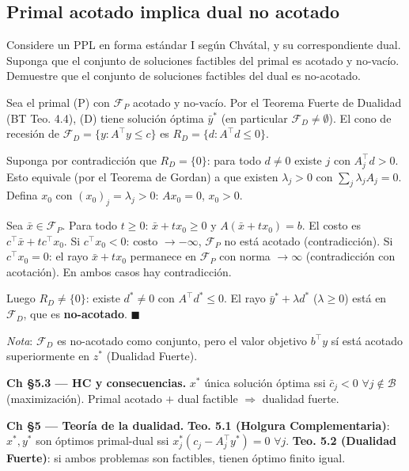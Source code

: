 \documentclass[12pt]{article}
\theoremstyle{plain}
\begin{document}
\bigskip

\subsection{Primal acotado implica dual no acotado}

Considere un PPL en forma estándar I según Chvátal, y su correspondiente dual. Suponga que
el conjunto de soluciones factibles del primal es acotado y no-vacío. Demuestre que el
conjunto de soluciones factibles del dual es no-acotado.

\begin{solucion}

Sea el primal (P) con $\mathcal{F}_P$ acotado y no-vacío. Por el Teorema Fuerte de Dualidad (BT Teo. 4.4), (D) tiene solución óptima $\bar{y}^*$ (en particular $\mathcal{F}_D\neq\emptyset$). El cono de recesión de $\mathcal{F}_D=\{y:A^\top y\leq c\}$ es $R_D=\{d:A^\top d\leq 0\}$.

Suponga por contradicción que $R_D=\{0\}$: para todo $d\neq 0$ existe $j$ con $A_j^\top d>0$. Esto equivale (por el Teorema de Gordan) a que existen $\lambda_j>0$ con $\sum_j\lambda_j A_j=0$. Defina $x_0$ con $(x_0)_j=\lambda_j>0$: $Ax_0=0$, $x_0>0$.

Sea $\bar{x}\in\mathcal{F}_P$. Para todo $t\geq 0$: $\bar{x}+tx_0\geq 0$ y $A(\bar{x}+tx_0)=b$. El costo es $c^\top\bar{x}+tc^\top x_0$. Si $c^\top x_0<0$: costo $\to -\infty$, $\mathcal{F}_P$ no está acotado (contradicción). Si $c^\top x_0=0$: el rayo $\bar{x}+tx_0$ permanece en $\mathcal{F}_P$ con norma $\to\infty$ (contradicción con acotación). En ambos casos hay contradicción.

Luego $R_D\neq\{0\}$: existe $d^*\neq 0$ con $A^\top d^*\leq 0$. El rayo $\bar{y}^*+\lambda d^*$ ($\lambda\geq 0$) está en $\mathcal{F}_D$, que es \textbf{no-acotado}. $\blacksquare$

\textit{Nota}: $\mathcal{F}_D$ es no-acotado como conjunto, pero el valor objetivo $b^\top y$ sí está acotado superiormente en $z^*$ (Dualidad Fuerte).

\end{solucion}

\begin{teofund}
\textbf{Ch §5.3 — HC y consecuencias.} $x^*$ única solución óptima ssi $\bar{c}_j<0$ $\forall j\notin\mathcal{B}$ (maximización). Primal acotado $+$ dual factible $\Rightarrow$ dualidad fuerte.

\textbf{Ch §5 — Teoría de la dualidad.} \textbf{Teo. 5.1 (Holgura Complementaria)}: $x^*,y^*$ son óptimos primal-dual ssi $x^*_j(c_j-A_j^\top y^*)=0$ $\forall j$. \textbf{Teo. 5.2 (Dualidad Fuerte)}: si ambos problemas son factibles, tienen óptimo finito igual.
\end{teofund}
\end{document}
